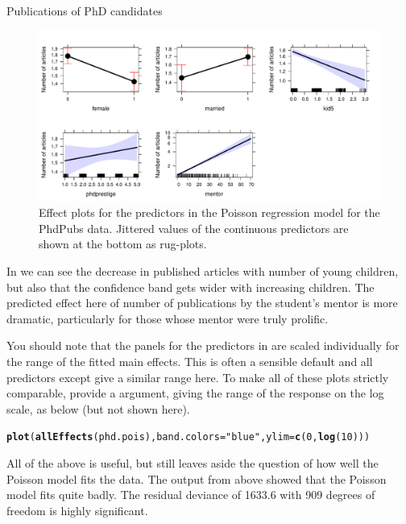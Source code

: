 \documentclass[11pt]{book}\usepackage[]{graphicx}\usepackage[]{color}
\makeatletter
\newcommand{\hlnum}[1]{\textcolor[rgb]{0.686,0.059,0.569}{#1}}%
\newcommand{\hlstr}[1]{\textcolor[rgb]{0.192,0.494,0.8}{#1}}%
\newcommand{\hlstd}[1]{\textcolor[rgb]{0.345,0.345,0.345}{#1}}%
\newcommand{\hlkwc}[1]{\textcolor[rgb]{0.333,0.667,0.333}{#1}}%
\newcommand{\hlkwd}[1]{\textcolor[rgb]{0.737,0.353,0.396}{\textbf{#1}}}%
\newenvironment{kframe}{%
 \def\at@end@of@kframe{}%
 \ifinner\ifhmode%
  \def\at@end@of@kframe{\end{minipage}}%
  \begin{minipage}{\columnwidth}%
 \fi\fi%
 \def\FrameCommand##1{\hskip\@totalleftmargin \hskip-\fboxsep
 \colorbox{shadecolor}{##1}\hskip-\fboxsep
     \hskip-\linewidth \hskip-\@totalleftmargin \hskip\columnwidth}%
 \MakeFramed {\advance\hsize-\width
   \@totalleftmargin\z@ \linewidth\hsize
   \@setminipage}}%
 {\par\unskip\endMakeFramed%
 \at@end@of@kframe}
\newenvironment{knitrout}{}{} %
\renewenvironment{knitrout}{\small\renewcommand{\baselinestretch}{.85}}{} %
\makeatother
\begin{document}
\begin{Example}[phdpubs1]{Publications of PhD candidates}
\begin{knitrout}
\begin{figure}[!htbp]
\centerline{\includegraphics[width=\textwidth]{ch09/fig/phdpubs1-effpois-1} }

\caption[Effect plots for the predictors in the Poisson regression model for the PhdPubs data]{Effect plots for the predictors in the Poisson regression model for the PhdPubs data. Jittered values of the continuous predictors are shown at the bottom as rug-plots.\label{fig:phdpubs1-effpois}}
\end{figure}


\end{knitrout}

In  we can see the decrease in published articles with
number of young children, but also that the confidence band gets wider with increasing
children.  The predicted effect here of number of publications by the student's mentor is more
dramatic, particularly for those whose mentor were truly prolific.

You should note that the panels for the predictors in  are scaled
individually for the range of the fitted main effects.  This is often a sensible default
and all predictors except  give a similar range here.  To make all of these
plots strictly comparable, provide a  argument, giving the range of the
response on the log scale, as below (but not shown here).
\begin{knitrout}
\color{fgcolor}\begin{kframe}
\begin{alltt}
\hlkwd{plot}\hlstd{(}\hlkwd{allEffects}\hlstd{(phd.pois),} \hlkwc{band.colors}\hlstd{=}\hlstr{"blue"}\hlstd{,} \hlkwc{ylim}\hlstd{=}\hlkwd{c}\hlstd{(}\hlnum{0}\hlstd{,}\hlkwd{log}\hlstd{(}\hlnum{10}\hlstd{)))}
\end{alltt}
\end{kframe}
\end{knitrout}

All of the above is useful, but still leaves aside the question of how well the Poisson model fits
the data. The output from  above showed that the Poisson model fits quite badly.
The residual deviance of 1633.6 with 909 degrees
of freedom is highly significant.

\end{Example}
\end{document}
